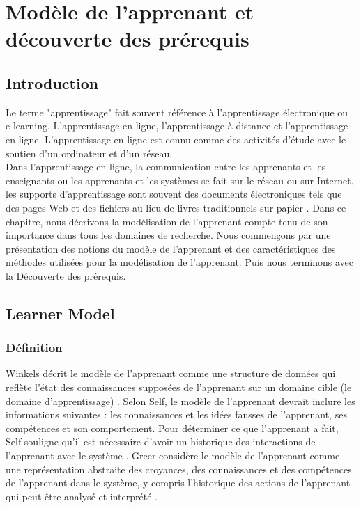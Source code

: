\chapter{Modèle de l'apprenant et découverte des prérequis} 
\label{chap2}
\minitoc
\thispagestyle{empty}
\newpage
\section{Introduction}
Le terme "apprentissage" fait souvent référence à l'apprentissage électronique ou e-learning. L’apprentissage en ligne, l'apprentissage à distance et l'apprentissage en ligne. L'apprentissage en ligne est connu comme des activités d'étude avec le soutien d'un ordinateur et d'un réseau. \\
Dans l'apprentissage en ligne, la communication entre les apprenants et les enseignants ou les apprenants et les systèmes se fait sur le réseau ou sur Internet, les supports d'apprentissage sont souvent des documents électroniques tels que des pages Web et des fichiers au lieu de livres traditionnels sur papier \cite{learner_model__adaptive_learning}. Dans ce chapitre, nous décrivons la modélisation de l'apprenant compte tenu de son importance dans tous les domaines de recherche. Nous commençons par une présentation des notions du modèle de l'apprenant et des caractéristiques des méthodes utilisées pour la modélisation de l'apprenant. Puis nous terminons avec la Découverte des prérequis.

\section{Learner Model}

\subsection{Définition}
Winkels décrit le modèle de l'apprenant comme une structure de données qui reflète l'état des connaissances supposées de l'apprenant sur un domaine cible (le domaine d'apprentissage) \cite{user_modelling_help_systems}. Selon Self, le modèle de l'apprenant devrait inclure les informations suivantes : les connaissances et les idées fausses de l'apprenant, ses compétences et son comportement. Pour déterminer ce que l’apprenant a fait, Self souligne qu’il est nécessaire d’avoir un historique des interactions de l’apprenant avec le système \cite{user_learner_modeling_workbench}.
Greer considère le modèle de l'apprenant comme une représentation abstraite des croyances, des connaissances et des compétences de l'apprenant dans le système, y compris l'historique des actions de l'apprenant qui peut être analysé et interprété \cite{psycho_oncology}.

